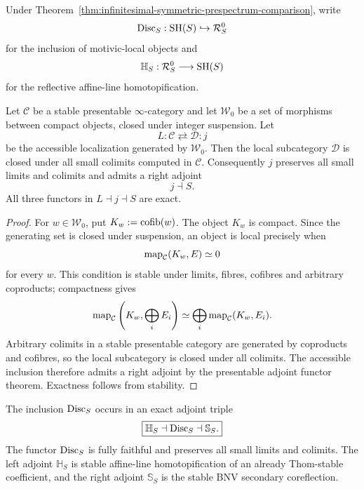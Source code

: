 Under Theorem~\ref{thm:infinitesimal-symmetric-prespectrum-comparison}, write
\[
  \operatorname{Disc}_S:\mathrm{SH}(S)\hookrightarrow\mathcal R_S^0
\]
for the inclusion of motivic-local objects and
\[
  \mathbb H_S:\mathcal R_S^0\longrightarrow\mathrm{SH}(S)
\]
for the reflective affine-line homotopification.

\begin{lemma}
\label{lem:infinitesimal-compact-stable-bireflection}
Let \(\mathcal C\) be a stable presentable \(\infty\)-category and let
\(\mathcal W_0\) be a set of morphisms between compact objects, closed under
integer suspension.  Let
\[
  L:\mathcal C\rightleftarrows\mathcal D:j
\]
be the accessible localization generated by \(\mathcal W_0\).  Then the local
subcategory \(\mathcal D\) is closed under all small colimits computed in
\(\mathcal C\).  Consequently \(j\) preserves all small limits and colimits
and admits a right adjoint
\[
  j\dashv S.
\]
All three functors in \(L\dashv j\dashv S\) are exact.
\end{lemma}

\begin{proof}
For \(w\in\mathcal W_0\), put \(K_w:=\operatorname{cofib}(w)\).  The object \(K_w\) is
compact.  Since the generating set is closed under suspension, an object is
local precisely when
\[
  \operatorname{map}_{\mathcal C}(K_w,E)\simeq0
\]
for every \(w\).  This condition is stable under limits, fibres, cofibres and
arbitrary coproducts; compactness gives
\[
  \operatorname{map}_{\mathcal C}
  \left(K_w,\bigoplus_iE_i\right)
  \simeq
  \bigoplus_i\operatorname{map}_{\mathcal C}(K_w,E_i).
\]
Arbitrary colimits in a stable presentable category are generated by coproducts
and cofibres, so the local subcategory is closed under all colimits.  The
accessible inclusion therefore admits a right adjoint by the presentable
adjoint functor theorem.  Exactness follows from stability.
\end{proof}

\begin{theorem}
\label{thm:infinitesimal-bnv-adjoint-triple}
The inclusion \(\operatorname{Disc}_S\) occurs in an exact adjoint triple
\[
  \boxed{
  \mathbb H_S
  \dashv
  \operatorname{Disc}_S
  \dashv
  \mathbb S_S.
  }
\]
The functor \(\operatorname{Disc}_S\) is fully faithful and preserves all small limits and
colimits.  The left adjoint \(\mathbb H_S\) is stable affine-line
homotopification of an already Thom-stable coefficient, and the right adjoint
\(\mathbb S_S\) is the stable BNV secondary coreflection.
\end{theorem}

